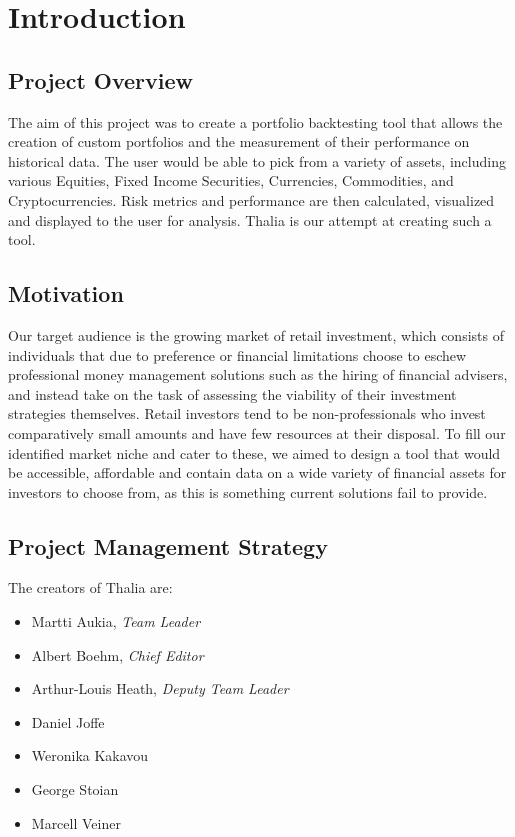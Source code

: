 \documentclass[main.tex]{subfiles}
\begin{document}
\section{Introduction}
\subsection {Project Overview}

The aim of this project was to create a portfolio backtesting tool that allows the creation of custom portfolios and the measurement of their performance on historical data. The user would be able to pick from a variety of assets, including various Equities, Fixed Income Securities, Currencies, Commodities, and Cryptocurrencies. Risk metrics and performance are then calculated, visualized and displayed to the user for analysis. Thalia is our attempt at creating such a tool.

\subsection{Motivation}
Our target audience is the growing market of retail investment, which consists of individuals that due to preference or financial limitations choose to eschew professional money management solutions such as the hiring of financial advisers, and instead take on the task of assessing the viability of their investment strategies themselves. Retail investors tend to be non-professionals who invest comparatively small amounts and have few resources at their disposal. To fill our identified market niche and cater to these, we aimed to design a tool that would be accessible, affordable and contain data on a wide variety of financial assets for investors to choose from, as this is something current solutions fail to provide\cite{WP}.

\subsection{Project Management Strategy}

The creators of Thalia are:
\begin{itemize}
    \item Martti Aukia, \textit{Team Leader}
	\item Albert Boehm, \textit{Chief Editor}
	\item Arthur-Louis Heath, \textit{Deputy Team Leader}
	\item Daniel Joffe
	\item Weronika Kakavou
	\item George Stoian
	\item Marcell Veiner
	
\end{itemize}
\end{document}
